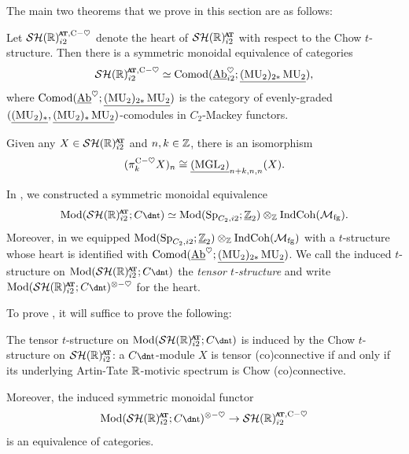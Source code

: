 The main two theorems that we prove in this section are as follows:

\begin{thm} \label{thm:chow-heart}
  Let $\SHRatch$ denote the heart of $\SHRat$ with respect to the Chow $t$-structure. Then there is a symmetric monoidal equivalence of categories
  \[\SHRatch \simeq \Comod(\uAbh_{i2}; \underline{(\MU_2)_{2*} \MU_2}),\]
  where $\mathrm{Comod}(\underline{\mathrm{Ab}}^{\heartsuit}; \underline{(\operatorname{\mathrm{MU}}_2)_{2*} \operatorname{\mathrm{MU}}_2})$ is the category of evenly-graded $(\underline{(\operatorname{\mathrm{MU}}_2)_{*}}, \underline{(\operatorname{\mathrm{MU}}_2)_{*} \operatorname{\mathrm{MU}}_2})$-comodules in $C_2$-Mackey functors.
\end{thm}

\begin{thm} \label{thm:pi0-MGL}
  Given any $X \in \SHRat$ and $n,k \in \mathbb{Z}$, there is an isomorphism
  \[(\pi_k ^{\mathrm{C}-\heartsuit} X)_n \cong \underline{(\mathrm{MGL}_2)}_{n+k,n,n} (X).\]
\end{thm}

\begin{rec}
In , we constructed a symmetric monoidal equivalence
\[ \Mod(\SHRat; C\ta) \simeq \Mod(\Sp_{C_2, i2}; \uZt) \otimes_{\Z} \IndCoh(\Mfg). \]
Moreover, in  we equipped $\mathrm{Mod}(\operatorname{\mathrm{Sp}}_{C_2, i2}; \underline{\mathbb{Z}}_{2}) \otimes_{\mathbb{Z}} \mathrm{IndCoh}(\mathcal{M}_{\mathrm{fg}})$ with a $t$-structure whose heart is identified with $\mathrm{Comod}(\underline{\mathrm{Ab}}^{\heartsuit}; \underline{(\operatorname{\mathrm{MU}}_2)_{2*} \operatorname{\mathrm{MU}}_2})$.
  We call the induced $t$-structure on $\Mod(\SHRat; C\ta)$ the \emph{tensor $t$-structure} and write $\Mod(\SHRat; C\ta)^{\th}$ for the heart.
\end{rec}

To prove , it will suffice to prove the following:

\begin{prop} \label{prop:t-compare}
  The tensor $t$-structure on $\Mod(\SHRat; C\ta)$ is induced by the Chow $t$-structure on $\SHRat$: a $C\ta$-module $X$ is tensor (co)connective if and only if its underlying Artin-Tate $\mathbb{R}$-motivic spectrum is Chow (co)connective.

  Moreover, the induced symmetric monoidal functor
  \[\Mod(\SHRat; C\ta)^{\th} \to \SHR_{i2}^{\at, \ch}\]
  is an equivalence of categories.
\end{prop}


